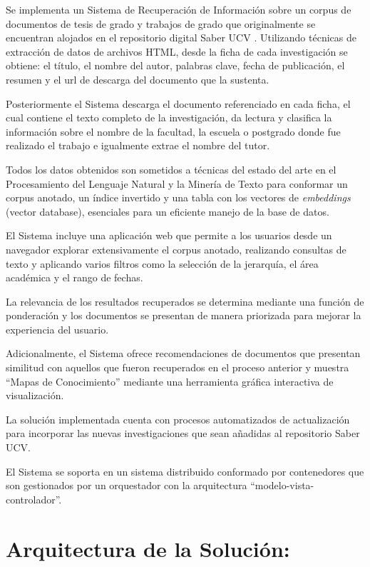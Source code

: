 \documentclass[
  12pt,
  openany]{book}
\begin{document}
Se implementa un Sistema de Recuperación de Información sobre un corpus de documentos de tesis de grado y trabajos de grado que originalmente se encuentran alojados en el repositorio digital Saber UCV . Utilizando técnicas de extracción de datos de archivos HTML, desde la ficha de cada investigación se obtiene: el título, el nombre del autor, palabras clave, fecha de publicación, el resumen y el url de descarga del documento que la sustenta.

Posteriormente el Sistema descarga el documento referenciado en cada ficha, el cual contiene el texto completo de la investigación, da lectura y clasifica la información sobre el nombre de la facultad, la escuela o postgrado donde fue realizado el trabajo e igualmente extrae el nombre del tutor.

Todos los datos obtenidos son sometidos a técnicas del estado del arte en el Procesamiento del Lenguaje Natural y la Minería de Texto para conformar un corpus anotado, un índice invertido y una tabla con los vectores de \emph{embeddings} (vector database), esenciales para un eficiente manejo de la base de datos.

El Sistema incluye una aplicación web que permite a los usuarios desde un navegador explorar extensivamente el corpus anotado, realizando consultas de texto y aplicando varios filtros como la selección de la jerarquía, el área académica y el rango de fechas.

La relevancia de los resultados recuperados se determina mediante una función de ponderación y los documentos se presentan de manera priorizada para mejorar la experiencia del usuario.

Adicionalmente, el Sistema ofrece recomendaciones de documentos que presentan similitud con aquellos que fueron recuperados en el proceso anterior y muestra ``Mapas de Conocimiento'' mediante una herramienta gráfica interactiva de visualización.

La solución implementada cuenta con procesos automatizados de actualización para incorporar las nuevas investigaciones que sean añadidas al repositorio Saber UCV.

El Sistema se soporta en un sistema distribuido conformado por contenedores que son gestionados por un orquestador con la arquitectura ``modelo-vista-controlador''.

\hypertarget{desarrolloarquitectura}{%
\section{Arquitectura de la Solución:}\label{desarrolloarquitectura}}
\end{document}
